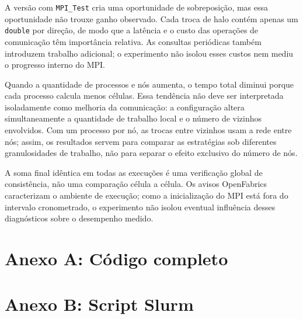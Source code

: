 \documentclass[11pt,letterpaper]{article}
\begin{document}
A versão com \texttt{MPI\_Test} cria uma oportunidade de sobreposição, mas essa oportunidade não trouxe ganho observado. Cada troca de halo contém apenas um \texttt{double} por direção, de modo que a latência e o custo das operações de comunicação têm importância relativa. As consultas periódicas também introduzem trabalho adicional; o experimento não isolou esses custos nem mediu o progresso interno do MPI.

Quando a quantidade de processos e nós aumenta, o tempo total diminui porque cada processo calcula menos células. Essa tendência não deve ser interpretada isoladamente como melhoria da comunicação: a configuração altera simultaneamente a quantidade de trabalho local e o número de vizinhos envolvidos. Com um processo por nó, as trocas entre vizinhos usam a rede entre nós; assim, os resultados servem para comparar as estratégias sob diferentes granulosidades de trabalho, não para separar o efeito exclusivo do número de nós.

A soma final idêntica em todas as execuções é uma verificação global de consistência, não uma comparação célula a célula. Os avisos OpenFabrics caracterizam o ambiente de execução; como a inicialização do MPI está fora do intervalo cronometrado, o experimento não isolou eventual influência desses diagnósticos sobre o desempenho medido.

\appendix
\clearpage
\section*{Anexo A: Código completo}


\section*{Anexo B: Script Slurm}

\end{document}
